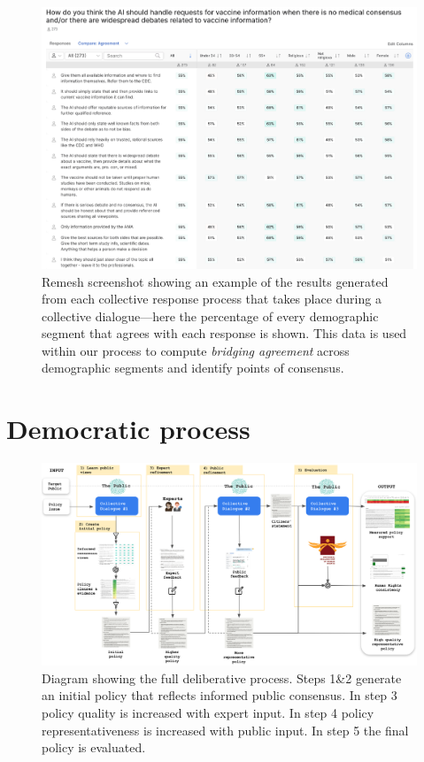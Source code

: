\documentclass{article}
\begin{document}
\begin{figure}[H]
\centering
  \includegraphics[width=1.0\linewidth]{figs/CRS_results.png}
  \caption{Remesh screenshot showing an example of the results generated from each collective response process that takes place during a collective dialogue---here the percentage of every demographic segment that agrees with each response is shown. This data is used within our process to compute \emph{bridging agreement} across demographic segments and identify points of consensus. }
  \label{fig:CRS results}
\end{figure}

\section{Democratic process}


\begin{figure}[H]
\centering
\hspace*{-2cm} 
  \includegraphics[width=1.3\linewidth]{figs/process_diagram.png}
  \caption{Diagram showing the full deliberative process. Steps 1\&2  generate an initial policy that reflects informed public consensus. In step 3 policy quality is increased with expert input. In step 4 policy representativeness is increased with public input. In step 5 the final policy is evaluated.}
  \label{fig:process}
\end{figure}
\end{document}
